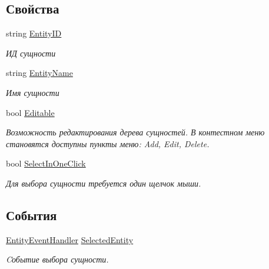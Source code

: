 \subsection*{Свойства}
\begin{DoxyCompactItemize}
\item 
string \mbox{\hyperlink{class_f_b_a_1_1_comp_entity_tree_f_b_a_ad5b5e5f7432e1fe41350bcf742ce32f0}{Entity\+ID}}
\begin{DoxyCompactList}\small\item\em ИД сущности \end{DoxyCompactList}\item 
string \mbox{\hyperlink{class_f_b_a_1_1_comp_entity_tree_f_b_a_aae7b7661911be7af1f72f0be6109b3ab}{Entity\+Name}}
\begin{DoxyCompactList}\small\item\em Имя сущности \end{DoxyCompactList}\item 
bool \mbox{\hyperlink{class_f_b_a_1_1_comp_entity_tree_f_b_a_a12ef5fa5ba2abb85fb47d690357819ba}{Editable}}
\begin{DoxyCompactList}\small\item\em Возможность редактирования дерева сущностей. В контестном меню становятся доступны пункты меню\+: Add, Edit, Delete. \end{DoxyCompactList}\item 
bool \mbox{\hyperlink{class_f_b_a_1_1_comp_entity_tree_f_b_a_a6d3b691ab84dc5717ebe389c59cb3dec}{Select\+In\+One\+Click}}
\begin{DoxyCompactList}\small\item\em Для выбора сущности требуется один щелчок мыши. \end{DoxyCompactList}\end{DoxyCompactItemize}
\subsection*{События}
\begin{DoxyCompactItemize}
\item 
\mbox{\hyperlink{namespace_f_b_a_a05acb24d71f58b94b801674d2a8c5b17}{Entity\+Event\+Handler}} \mbox{\hyperlink{class_f_b_a_1_1_comp_entity_tree_f_b_a_a3c1dd6eb80c7acc2400ab47fff004273}{Selected\+Entity}}
\begin{DoxyCompactList}\small\item\em Cобытие выбора сущности. \end{DoxyCompactList}\end{DoxyCompactItemize}



